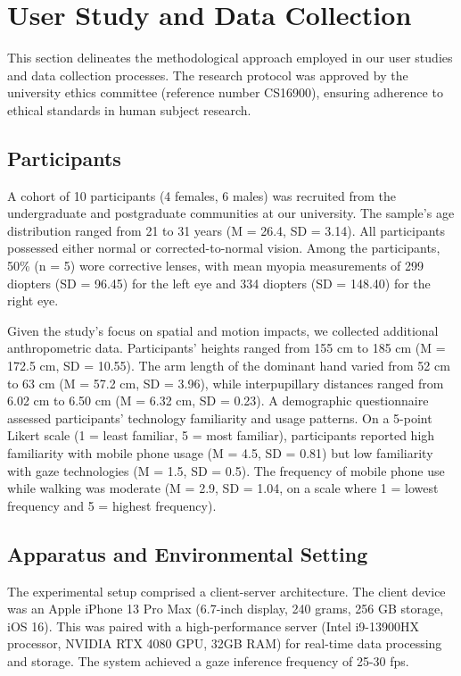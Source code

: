 \section{User Study and Data Collection}\label{sec:userstudy}

This section delineates the methodological approach employed in our user studies and data collection processes. The research protocol was approved by the university ethics committee (reference number CS16900), ensuring adherence to ethical standards in human subject research.


\subsection{Participants}

A cohort of 10 participants (4 females, 6 males) was recruited from the undergraduate and postgraduate communities at our university. The sample's age distribution ranged from 21 to 31 years (M = 26.4, SD = 3.14). All participants possessed either normal or corrected-to-normal vision. Among the participants, 50\% (n = 5) wore corrective lenses, with mean myopia measurements of 299 diopters (SD = 96.45) for the left eye and 334 diopters (SD = 148.40) for the right eye.

Given the study's focus on spatial and motion impacts, we collected additional anthropometric data. Participants' heights ranged from 155 cm to 185 cm (M = 172.5 cm, SD = 10.55). The arm length of the dominant hand varied from 52 cm to 63 cm (M = 57.2 cm, SD = 3.96), while interpupillary distances ranged from 6.02 cm to 6.50 cm (M = 6.32 cm, SD = 0.23).
A demographic questionnaire assessed participants' technology familiarity and usage patterns. On a 5-point Likert scale (1 = least familiar, 5 = most familiar), participants reported high familiarity with mobile phone usage (M = 4.5, SD = 0.81) but low familiarity with gaze technologies (M = 1.5, SD = 0.5). The frequency of mobile phone use while walking was moderate (M = 2.9, SD = 1.04, on a scale where 1 = lowest frequency and 5 = highest frequency).


\subsection{Apparatus and Environmental Setting}

The experimental setup comprised a client-server architecture. The client device was an Apple iPhone 13 Pro Max (6.7-inch display, 240 grams, 256 GB storage, iOS 16). This was paired with a high-performance server (Intel i9-13900HX processor, NVIDIA RTX 4080 GPU, 32GB RAM) for real-time data processing and storage. The system achieved a gaze inference frequency of 25-30 fps.

